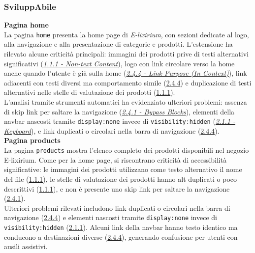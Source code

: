 \subsubsection{SviluppAbile}
\noindent \textbf{Pagina home}\\
La pagina \texttt{home} presenta la home page di \textit{E-lixirium}, con sezioni dedicate al logo, alla navigazione e alla presentazione di categorie e prodotti. L’estensione ha rilevato alcune criticità principali: immagini dei prodotti prive di testi alternativi significativi ({\hyperref[wcag:1.1.1]{\textit{1.1.1 - Non-text Content}}}), logo con link circolare verso la home anche quando l’utente è già sulla home ({\hyperref[wcag:2.4.4]{\textit{2.4.4 - Link Purpose (In Context)}}}), link adiacenti con testi diversi ma comportamento simile ({\hyperref[wcag:2.4.4]{2.4.4}}) e duplicazione di testi alternativi nelle stelle di valutazione dei prodotti ({\hyperref[wcag:1.1.1]{1.1.1}}).\\
L’analisi tramite strumenti automatici ha evidenziato ulteriori problemi: assenza di skip link per saltare la navigazione ({\hyperref[wcag:2.4.1]{\textit{2.4.1 - Bypass Blocks}}}), elementi della navbar nascosti tramite \texttt{display:none} invece di \texttt{visibility:hidden} ({\hyperref[wcag:2.1.1]{\textit{2.1.1 - Keyboard}}}), e link duplicati o circolari nella barra di navigazione ({\hyperref[wcag:2.4.4]{2.4.4}}).\\

\noindent \textbf{Pagina products}\\
La pagina \texttt{products} mostra l’elenco completo dei prodotti disponibili nel negozio E-lixirium. Come per la home page, si riscontrano criticità di accessibilità significative: le immagini dei prodotti utilizzano come testo alternativo il nome del file ({\hyperref[wcag:1.1.1]{1.1.1}}), le stelle di valutazione dei prodotti hanno alt duplicati o poco descrittivi ({\hyperref[wcag:1.1.1]{1.1.1}}), e non è presente uno skip link per saltare la navigazione ({\hyperref[wcag:2.4.1]{2.4.1}}).\\
Ulteriori problemi rilevati includono link duplicati o circolari nella barra di navigazione ({\hyperref[wcag:2.4.4]{2.4.4}}) e elementi nascosti tramite \texttt{display:none} invece di \texttt{visibility:hidden} ({\hyperref[wcag:2.1.1]{2.1.1}}). Alcuni link della navbar hanno testo identico ma conducono a destinazioni diverse ({\hyperref[wcag:2.4.4]{2.4.4}}), generando confusione per utenti con ausili assistivi.\\


